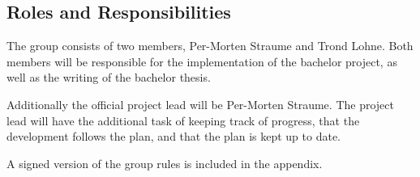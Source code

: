 \subsection{Roles and Responsibilities}
The group consists of two members, Per-Morten Straume and Trond Lohne.
Both members will be responsible for the implementation of the bachelor project, as well as the writing of the bachelor thesis.

Additionally the official project lead will be Per-Morten Straume.
The project lead will have the additional task of keeping track of progress,
that the development follows the plan, and that the plan is kept up to date.

A signed version of the group rules is included in the appendix. 
